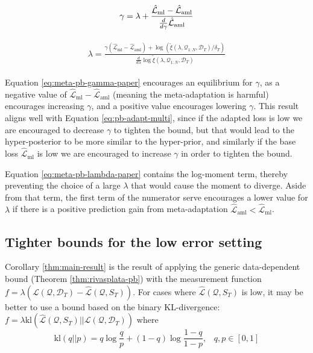 \documentclass{article}
\theoremstyle{definition}
\begin{document}
\begin{align} \label{eq:meta-pb-gamma-paper}
\begin{split}
\gamma = \lambda+\frac{\hat{\mathcal{L}}_{\mathrm{ml}}-\hat{\mathcal{L}}_{\mathrm{aml}}}{\frac{d}{d\gamma}\hat{\mathcal{L}}_{\mathrm{aml}}}
\end{split}\hfill
\end{align}

\begin{align} \label{eq:meta-pb-lambda-paper}
\begin{split}
\lambda = \frac{\gamma(\hat{\mathcal{L}}_{\mathrm{ml}}-\hat{\mathcal{L}}_{\mathrm{aml}})+\log\left (\tilde{\xi}(\lambda,\mathcal{Q}_{1:N},\mathcal{D}_T)/\delta_T\right )}{\frac{d}{d\lambda}\log\tilde{\xi}(\lambda,\mathcal{Q}_{1:N},\mathcal{D}_T)}
\end{split}
\end{align}

Equation \ref{eq:meta-pb-gamma-paper} encourages an equilibrium for $\gamma$, as a negative value of $\hat{\mathcal{L}}_{\mathrm{ml}}-\hat{\mathcal{L}}_{\mathrm{aml}}$ (meaning the meta-adaptation is harmful) encourages increasing $\gamma$, and a positive value encourages lowering $\gamma$.
This result aligns well with Equation \ref{eq:pb-adapt-multi}, since if the adapted loss is low we are encouraged to decrease $\gamma$ to tighten the bound, but that would lead to the hyper-posterior to be more similar to the hyper-prior, and similarly if the base loss $\hat{\mathcal{L}}_{\mathrm{ml}}$ is low we are encouraged to increase $\gamma$ in order to tighten the bound.

Equation \ref{eq:meta-pb-lambda-paper} contains the log-moment term, thereby preventing the choice of a large $\lambda$ that would cause the moment to diverge. Aside from that term, 
the first term of the numerator serve encourages a lower value for $\lambda$ if there is a positive prediction gain from meta-adaptation $\hat{\mathcal{L}}_{\mathrm{aml}}<\hat{\mathcal{L}}_{\mathrm{ml}}$.

\subsection{Tighter bounds for the low error setting}

Corollary \ref{thm:main-result} is the result of applying the generic data-dependent bound (Theorem \ref{thm:rivasplata-pb}) with the measurement function $f=\lambda(\mathcal{L}(\mathcal{Q},\mathcal{D}_T)-\hat{\mathcal{L}}(\mathcal{Q}, S_T))$. For cases where $\hat{\mathcal{L}}(\mathcal{Q}, S_T)$ is low, it may be better to use a bound based on the binary KL-divergence: $f=\lambda \mathrm{kl}(\hat{\mathcal{L}}(\mathcal{Q}, S_T)||\mathcal{L}(\mathcal{Q},\mathcal{D}_T))$
where $$\mathrm{kl}(q||p)=q \log\frac{q}{p}+(1-q)\log\frac{1-q}{1-p},\;\;\; q,p\in[0, 1]$$
\end{document}
